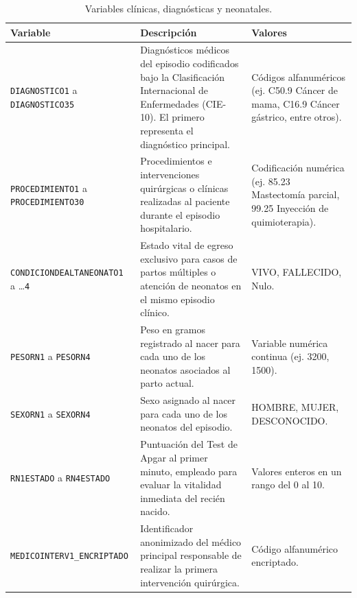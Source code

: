 \begin{table}[htbp]
\centering
\footnotesize
\setlength{\tabcolsep}{4pt}
\renewcommand{\arraystretch}{1.15}
\caption{Variables clínicas, diagnósticas y neonatales.}
\label{tab:variables_clinicas}
\begin{tabular}{|l|l|l|}
\hline
\parbox[t]{3.8cm}{\textbf{Variable}} & \parbox[t]{5.4cm}{\textbf{Descripción}} & \parbox[t]{3.8cm}{\textbf{Valores}} \\ \hline
\parbox[t]{3.8cm}{\texttt{DIAGNOSTICO1} a \texttt{DIAGNOSTICO35}} & \parbox[t]{5.4cm}{Diagnósticos médicos del episodio codificados bajo la Clasificación Internacional de Enfermedades (CIE-10). El primero representa el diagnóstico principal.} & \parbox[t]{3.8cm}{Códigos alfanuméricos (ej. C50.9 Cáncer de mama, C16.9 Cáncer gástrico, entre otros).} \\ \hline
\parbox[t]{3.8cm}{\texttt{PROCEDIMIENTO1} a \texttt{PROCEDIMIENTO30}} & \parbox[t]{5.4cm}{Procedimientos e intervenciones quirúrgicas o clínicas realizadas al paciente durante el episodio hospitalario.} & \parbox[t]{3.8cm}{Codificación numérica (ej. 85.23 Mastectomía parcial, 99.25 Inyección de quimioterapia).} \\ \hline
\parbox[t]{3.8cm}{\texttt{CONDICIONDEALTANEONATO1} a \dots\texttt{4}} & \parbox[t]{5.4cm}{Estado vital de egreso exclusivo para casos de partos múltiples o atención de neonatos en el mismo episodio clínico.} & \parbox[t]{3.8cm}{VIVO, FALLECIDO, Nulo.} \\ \hline
\parbox[t]{3.8cm}{\texttt{PESORN1} a \texttt{PESORN4}} & \parbox[t]{5.4cm}{Peso en gramos registrado al nacer para cada uno de los neonatos asociados al parto actual.} & \parbox[t]{3.8cm}{Variable numérica continua (ej. 3200, 1500).} \\ \hline
\parbox[t]{3.8cm}{\texttt{SEXORN1} a \texttt{SEXORN4}} & \parbox[t]{5.4cm}{Sexo asignado al nacer para cada uno de los neonatos del episodio.} & \parbox[t]{3.8cm}{HOMBRE, MUJER, DESCONOCIDO.} \\ \hline
\parbox[t]{3.8cm}{\texttt{RN1ESTADO} a \texttt{RN4ESTADO}} & \parbox[t]{5.4cm}{Puntuación del Test de Apgar al primer minuto, empleado para evaluar la vitalidad inmediata del recién nacido.} & \parbox[t]{3.8cm}{Valores enteros en un rango del 0 al 10.} \\ \hline
\parbox[t]{3.8cm}{\texttt{MEDICOINTERV1\_ENCRIPTADO}} & \parbox[t]{5.4cm}{Identificador anonimizado del médico principal responsable de realizar la primera intervención quirúrgica.} & \parbox[t]{3.8cm}{Código alfanumérico encriptado.} \\ \hline

\end{tabular}
\end{table}
